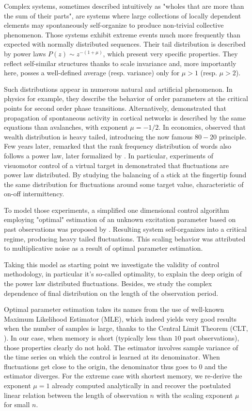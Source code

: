 \documentclass[FinalReport.tex]{subfiles}
\begin{document}
Complex systems, sometimes described intuitively as "wholes that are more than the sum of their parts", are systems where large collections of locally dependent elements may spontaneously self-organize to produce non-trivial collective phenomenon. Those systems exhibit extreme events much more frequently than expected with normally distributed sequences. Their tail distribution is described by power laws $P(z)\sim z^{-(1+\mu)}$, which present very specific properties. They reflect self-similar structures thanks to scale invariance and, more importantly here, posses a well-defined average (resp. variance) only for $\mu>1$ (resp. $\mu>2$). 

Such distributions appear in numerous natural and artificial phenomenon. In physics for example, they describe the behavior of order parameters at the critical points for second order phase transitions. Alternatively, \citet{Beggs} demonstrated that propagation of spontaneous activity in cortical networks is described by the same equations than avalanches, with exponent $\mu=-1/2$. In economics, \citet{pareto} observed that wealth distribution is heavy tailed, introducing the now famous $80-20$ principle. Few years later, \citet{estoup1916} remarked that the rank frequency distribution of words also follows a power law, later formalized by \citet{zipf}. In particular, experiments of visuomotor control of a virtual target in \citet{Bormann} demonstrated that fluctuations are power law distributed. By studying the balancing of a stick at the fingertip \citet{on-off-balancing} found the same distribution for fluctuations around some target value, characteristic of on-off intermittency. 

To model those experiments, a simplified one dimensional control algorithm employing "optimal" estimation of an unknown excitation parameter based on past observations  was proposed by \citet{OptCont}. Resulting system self-organizes into a critical regime, producing heavy tailed fluctuations. This scaling behavior was attributed to multiplicative noise as a result of optimal parameter estimation.  
 
Taking this model as starting point we investigate the validity of control methodology, in particular it's so-called optimality, to explain the deep origin of the power law distributed fluctuations. Besides, we study the complex dependence of final distribution on the length of the observation period. 

Optimal parameter estimation takes its names from the use of well-known Maximum Likelihood Estimator (MLE), which indeed yields very good results when the number of samples is large, thanks to the Central Limit Theorem (CLT, \citet{CoxHink74}). In our case, when memory is short (typically less than $10$ past observations), those properties clearly do not hold. The estimator involves sample variance of the time series on which the control is learned at its denominator. When fluctuations get close to the origin, the denominator thus goes to $0$ and the estimator diverges. For the extreme case with shortest memory, we re-derive the exponent $\mu=1$ already computed analytically in \citet{FrontNanoScience} and recover the postulated linear relation between the length of observation $n$ with the scaling exponent $\mu$ for small $n$.
 
\end{document}
